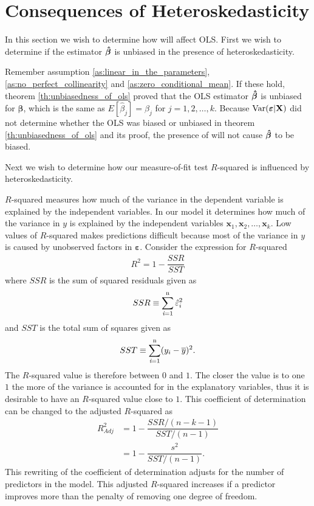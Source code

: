 \section{Consequences of Heteroskedasticity}\label{sec:consequence_of_hetero}
In this section we wish to determine how \hetero will affect OLS. 
First we wish to determine if the estimator $\operatorname{\boldsymbol{\hat{\beta}}}$ is unbiased in the presence of heteroskedasticity.  

Remember assumption \ref{as:linear_in_the_parameters}, \ref{as:no_perfect_collinearity} and \ref{as:zero_conditional_mean}. If these hold, theorem \ref{th:unbiasedness_of_ols} proved that the OLS estimator $\operatorname{\boldsymbol{\hat{\beta}}}$ is unbiased for $\boldsymbol{\beta}$, which is the same as $E[\hat{\beta}_j] = \beta_j
$ for $j = 1,2, \ldots, k$. 
Because $\operatorname{\text{Var}}(\boldsymbol{\varepsilon} | \mathbf{X})$ did not determine whether the OLS was biased or unbiased in theorem \ref{th:unbiasedness_of_ols} and its proof, the presence of \hetero will not cause $\operatorname{\boldsymbol{\hat{\beta}}}$ to be biased. 

Next we wish to determine how our measure-of-fit test $R$-squared is influenced by heteroskedasticity.

$R$-squared measures how much of the variance in the dependent variable is explained by the independent variables. In our model it determines how much of the variance in $y$ is explained by the independent variables $\mathbf{x}_1, \mathbf{x}_2, \ldots, \mathbf{x}_k$. 
Low values of $R$-squared makes predictions difficult because most of the variance in $y$ is caused by unobserved factors in $\boldsymbol{\varepsilon}$.
Consider the expression for $R$-squared
\begin{align*}
    R^2 = 1 - \dfrac{SSR}{SST}
\end{align*}
where $SSR$ is the sum of squared residuals given as
\begin{align*}
    SSR \equiv \operatorname{\sum_{\textit{i}=1}^n} \hat{\varepsilon}_i^2
\end{align*}
and $SST$ is the total sum of squares given as
\begin{align*}
    SST \equiv \operatorname{\sum_{\textit{i}=1}^n} (y_i - \overline{y})^2. 
\end{align*}
The $R$-squared value is therefore between $0$ and $1$. The closer the value is to one $1$ the more of the variance is accounted for in the explanatory variables, thus it is desirable to have an $R$-squared value close to $1$.
This coefficient of determination can be changed to the adjusted $R$-squared as
\begin{align}\label{eq:r_adjusted}
    R^2_{Adj} &= 1 - \dfrac{SSR/(n - k - 1)}{SST/(n - 1)}\\
      &= 1 - \dfrac{s^2}{SST/(n-1)}.
\end{align}
This rewriting of the coefficient of determination adjusts for the number of predictors in the model. This adjusted $R$-squared increases if a predictor improves more than the penalty of removing one degree of freedom. 

